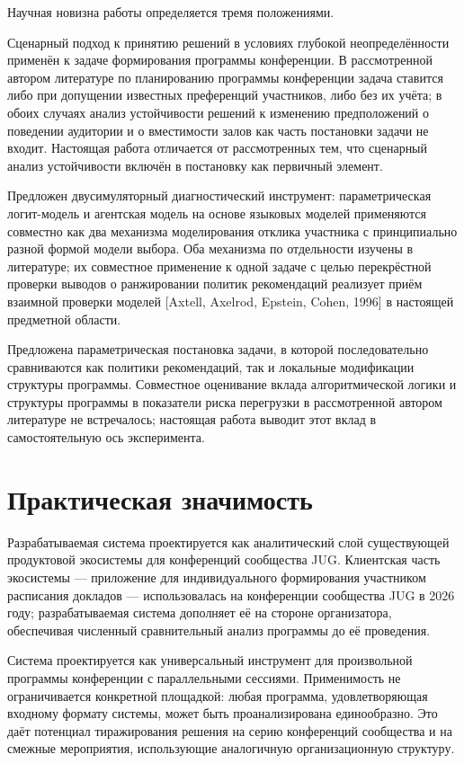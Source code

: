 Научная новизна работы определяется тремя положениями.

Сценарный подход к принятию решений в условиях глубокой неопределённости применён к задаче формирования программы конференции. В рассмотренной автором литературе по планированию программы конференции задача ставится либо при допущении известных преференций участников, либо без их учёта; в обоих случаях анализ устойчивости решений к изменению предположений о поведении аудитории и о вместимости залов как часть постановки задачи не входит. Настоящая работа отличается от рассмотренных тем, что сценарный анализ устойчивости включён в постановку как первичный элемент.

Предложен двусимуляторный диагностический инструмент: параметрическая логит-модель и агентская модель на основе языковых моделей применяются совместно как два механизма моделирования отклика участника с принципиально разной формой модели выбора. Оба механизма по отдельности изучены в литературе; их совместное применение к одной задаче с целью перекрёстной проверки выводов о ранжировании политик рекомендаций реализует приём взаимной проверки моделей [Axtell, Axelrod, Epstein, Cohen, 1996] в настоящей предметной области.

Предложена параметрическая постановка задачи, в которой последовательно сравниваются как политики рекомендаций, так и локальные модификации структуры программы. Совместное оценивание вклада алгоритмической логики и структуры программы в показатели риска перегрузки в рассмотренной автором литературе не встречалось; настоящая работа выводит этот вклад в самостоятельную ось эксперимента.


\section*{Практическая значимость}

Разрабатываемая система проектируется как аналитический слой существующей продуктовой экосистемы для конференций сообщества JUG. Клиентская часть экосистемы --- приложение для индивидуального формирования участником расписания докладов --- использовалась на конференции сообщества JUG в 2026 году; разрабатываемая система дополняет её на стороне организатора, обеспечивая численный сравнительный анализ программы до её проведения.

Система проектируется как универсальный инструмент для произвольной программы конференции с параллельными сессиями. Применимость не ограничивается конкретной площадкой: любая программа, удовлетворяющая входному формату системы, может быть проанализирована единообразно. Это даёт потенциал тиражирования решения на серию конференций сообщества и на смежные мероприятия, использующие аналогичную организационную структуру.

